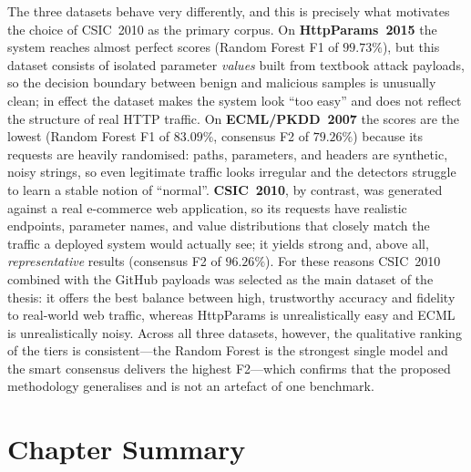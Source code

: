 \documentclass[../main.tex]{subfiles}
\begin{document}
The three datasets behave very differently, and this is precisely what
motivates the choice of CSIC~2010 as the primary corpus. On
\textbf{HttpParams~2015} the system reaches almost perfect scores
(Random Forest F1 of $99.73\%$), but this dataset consists of isolated
parameter \emph{values} built from textbook attack payloads, so the decision
boundary between benign and malicious samples is unusually clean; in effect
the dataset makes the system look ``too easy'' and does not reflect the
structure of real HTTP traffic. On \textbf{ECML/PKDD~2007} the scores are the
lowest (Random Forest F1 of $83.09\%$, consensus F2 of $79.26\%$) because its
requests are heavily randomised: paths, parameters, and headers are
synthetic, noisy strings, so even legitimate traffic looks irregular and the
detectors struggle to learn a stable notion of ``normal''. \textbf{CSIC~2010},
by contrast, was generated against a real e-commerce web application, so its
requests have realistic endpoints, parameter names, and value distributions
that closely match the traffic a deployed system would actually see; it
yields strong and, above all, \emph{representative} results
(consensus F2 of $96.26\%$). For these reasons CSIC~2010 combined with the
GitHub payloads was selected as the main dataset of the thesis: it offers the
best balance between high, trustworthy accuracy and fidelity to real-world
web traffic, whereas HttpParams is unrealistically easy and ECML is
unrealistically noisy. Across all three datasets, however, the qualitative
ranking of the tiers is consistent---the Random Forest is the strongest
single model and the smart consensus delivers the highest F2---which confirms
that the proposed methodology generalises and is not an artefact of one
benchmark.

\section{Chapter Summary}
\label{sec:ch4summary}
\end{document}
